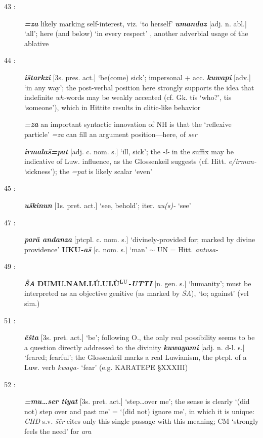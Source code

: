 \documentclass[10pt]{article}
\newcommand{\supersc}[1]{$^{\textrm{\scriptsize{#1}}}$}  	%
\newcommand{\bit}[1]{\textbf{\textit{#1}}}				%
\newcommand{\p}[1]{{\tiny[{#1}]}}					%
\newcommand{\hith}{\textsubwedge{h}}
\renewcommand{\.}[1]{\textsubdot{#1}}
\begin{document}
\begin{description}
\item[43 :] \bit{=za} likely marking self-interest, viz. `to herself' \bit{{\hith}umandaz} \p{adj. n. abl.} `all'; here (and below) `in every respect' , another adverbial usage of the ablative

\item[44 :] \bit{i\v{s}tarkzi} \p{3s. pres. act.} `be(come) sick'; impersonal + acc. \bit{kuwapi} \p{adv.} `in any way'; the post-verbal position here strongly supports the idea that indefinite \textit{wh-}words may be weakly accented (cf. Gk. {\greektext t\'is} `who?', {\greektext tis} `someone'), which in Hittite results in clitic-like behavior 

\bit{=za} an important syntactic innovation of NH is that the `reflexive particle' \textit{=za} can fill an argument position---here, of \textit{ser} 

\bit{irmala\v{s}=pat} \p{adj. c. nom. s.} `ill, sick'; the \textit{-l-} in the suffix may be indicative of Luw. influence, as the Glossenkeil suggests (cf. Hitt. \textit{e/irman-} `sickness'); the \textit{=pat} is likely scalar `even'

\item[45 :] \bit{u\v{s}kinun} \p{1s. pret. act.} `see, behold'; iter. \textit{au(s)-} `see'

\item[47 :] \bit{par\=a {\hith}andanza} \p{ptcpl. c. nom. s.} `divinely-provided for; marked by divine providence' \textbf{UKU}\bit{-a\v{s}} \p{c. nom. s.} `man' $\sim$ UN = Hitt. \textit{antu{\hith}sa-}

\item[49 :] \bit{\v{S}A} \textbf{DUMU.NAM.L\'U.UL\`U\supersc{LU}}\bit{-UTTI} \p{n. gen. s.} `humanity'; must be interpreted as an objective genitive (as marked by \textit{\v{S}A}), `to; against' (vel sim.)

\item[51 :] \bit{\=e\v{s}ta} \p{3s. pret. act.} `be'; following O., the only real possibility seems to be a question directly addressed to the divinity \bit{kuwayami} \p{adj. n. d-l. s.} `feared; fearful'; the Glossenkeil marks a real Luwianism, the ptcpl. of a Luw. verb \textit{kwaya-} `fear' (e.g. KARATEPE {\S}XXXIII)

\item[52 :] \bit{=mu{\ldots}ser tiyat} \p{3s. pret. act.} `step{\ldots}over me'; the sense is clearly `(did not) step over and past me' = `(did not) ignore me', in which it is unique: \textit{CHD} s.v. \textit{\v{s}\=er} cites only this single passage with this meaning; CM `strongly feels the need' for \textit{ar{\hith}a}


\end{description}
\end{document}
